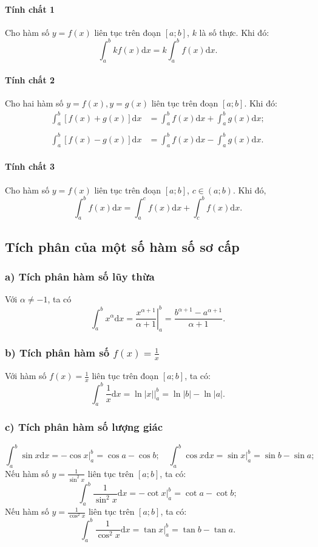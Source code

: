 \documentclass[12pt,a4paper,oneside]{book}
\theoremstyle{theorem}
\theoremstyle{definition}
\begin{document}
\paragraph{Tính chất 1}
Cho hàm số $y = f(x)$ liên tục trên đoạn $[a; b]$, $k$ là số thực. Khi đó:
\[
\int_a^b k f(x) \mathrm{d}x = k \int_a^b f(x) \mathrm{d}x.
\]

\paragraph{Tính chất 2}
Cho hai hàm số $y = f(x), y = g(x)$ liên tục trên đoạn $[a; b]$. Khi đó:
\begin{align*}
\int_a^b \left[ f(x) + g(x) \right] \mathrm{d}x &= \int_a^b f(x) \mathrm{d}x + \int_a^b g(x) \mathrm{d}x; \\\\
\int_a^b \left[ f(x) - g(x) \right] \mathrm{d}x &= \int_a^b f(x) \mathrm{d}x - \int_a^b g(x) \mathrm{d}x.
\end{align*}

\paragraph{Tính chất 3}
Cho hàm số $y = f(x)$ liên tục trên đoạn $[a; b]$, $c \in (a; b)$. Khi đó,
\[
\int_a^b f(x) \mathrm{d}x = \int_a^c f(x) \mathrm{d}x + \int_c^b f(x) \mathrm{d}x.
\]

\subsection{Tích phân của một số hàm số sơ cấp}

\subsubsection{a) Tích phân hàm số lũy thừa}
Với $\alpha \neq -1$, ta có 
\[
\int_a^b x^\alpha \mathrm{d}x = \left. \frac{x^{\alpha+1}}{\alpha+1} \right|_a^b = \frac{b^{\alpha+1} - a^{\alpha+1}}{\alpha+1}.
\]

\subsubsection{b) Tích phân hàm số $f(x) = \frac{1}{x}$}
Với hàm số $f(x) = \frac{1}{x}$ liên tục trên đoạn $[a; b]$, ta có:
\[
\int_a^b \frac{1}{x} \mathrm{d}x = \left. \ln|x| \right|_a^b = \ln|b| - \ln|a|.
\]
\subsubsection{c) Tích phân hàm số lượng giác}
\[
\int_a^b \sin x \mathrm{d}x = \left. -\cos x \right|_a^b = \cos a - \cos b; \quad \int_a^b \cos x \mathrm{d}x = \left. \sin x \right|_a^b = \sin b - \sin a;
\]
Nếu hàm số $y = \frac{1}{\sin^2 x}$ liên tục trên $[a; b]$, ta có:
\[
\int_a^b \frac{1}{\sin^2 x} \mathrm{d}x = \left. -\cot x \right|_a^b = \cot a - \cot b;
\]
Nếu hàm số $y = \frac{1}{\cos^2 x}$ liên tục trên $[a; b]$, ta có:
\[
\int_a^b \frac{1}{\cos^2 x} \mathrm{d}x = \left. \tan x \right|_a^b = \tan b - \tan a.
\]
\end{document}
